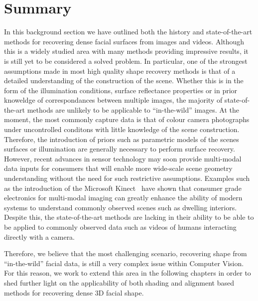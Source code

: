 \section{Summary}\label{sec:bg_summary}
In this background section we have outlined both the history and state-of-the-art
methods for recovering dense facial surfaces from images and videos. Although
this is a widely studied area with many methods providing impressive results,
it is still yet to be considered a solved problem. In particular, one of the
strongest assumptions made in most high quality shape recovery methods is
that of a detailed understanding of the construction of the scene. Whether
this is in the form of the illumination conditions, surface reflectance
properties or in prior knoweldge of correspondances between multiple images,
the majority of state-of-the-art methods are unlikely to be applicable to
``in-the-wild'' images. At the moment, the most commonly capture data
is that of colour camera photographs under uncontrolled conditons with
little knowledge of the scene construction. Therefore, the introduction
of priors such as parametric models of the scenes surfaces or illumination
are generally necessary to perform surface recovery. However, recent
advances in sensor technology may soon provide multi-modal data inputs for
consumers that will enable more wide-scale scene geometry understanding
without the need for such restrictive assumptions. Examples such as the
introduction of the Microsoft Kinect~\cite{zhang2012microsoft} have shown
that consumer grade electronics for multi-modal imaging can greatly enhance
the ability of modern systems to understand commonly observed scenes such as
dwelling interiors. Despite this, the state-of-the-art methods are lacking in
their ability to be able to be applied to commonly observed data such as videos
of humans interacting directly with a camera.

Therefore, we believe that the most challenging scenario,
recovering shape from ``in-the-wild'' facial data, is still
a very complex issue within Computer Vision. For this reason, we work to extend
this area in the following chapters in order to shed further light on the
applicability of both shading and alignment based methods for recovering
dense 3D facial shape.
